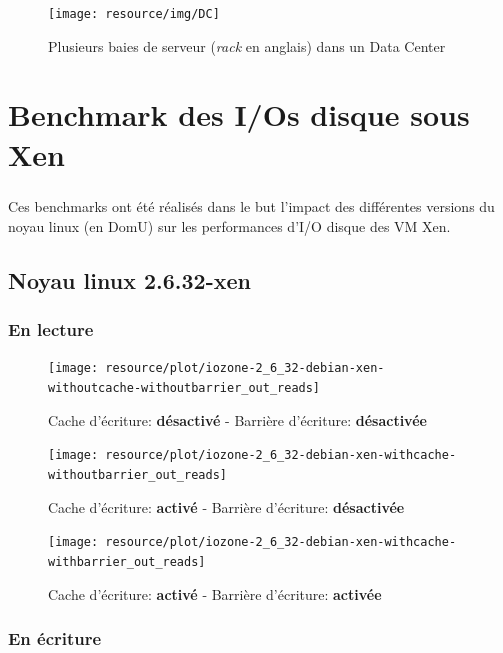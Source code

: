 \begin{figure}[H]
	\centering
	\texttt{[image: resource/img/DC]}
	\caption{Plusieurs baies de serveur (\emph{rack} en anglais) dans un Data Center}
\end{figure}


\chapter{Benchmark des I/Os disque sous Xen}

\paragraph*{}
Ces benchmarks ont été réalisés dans le but l'impact des différentes versions du noyau linux
(en DomU) sur les performances d'I/O disque des VM Xen.


\section{Noyau linux 2.6.32-xen}

\subsection*{En lecture}

\begin{figure}[H]
	\centering
	\texttt{[image: resource/plot/iozone-2\_6\_32-debian-xen-withoutcache-withoutbarrier\_out\_reads]}
	\caption{Cache d'écriture: \textbf{désactivé}   -   Barrière d'écriture: \textbf{désactivée}}
\end{figure}

\begin{figure}[H]
	\centering
	\texttt{[image: resource/plot/iozone-2\_6\_32-debian-xen-withcache-withoutbarrier\_out\_reads]}
	\caption{Cache d'écriture: \textbf{activé}   -   Barrière d'écriture: \textbf{désactivée}}
\end{figure}

\begin{figure}[H]
	\centering
	\texttt{[image: resource/plot/iozone-2\_6\_32-debian-xen-withcache-withbarrier\_out\_reads]}
	\caption{Cache d'écriture: \textbf{activé}   -   Barrière d'écriture: \textbf{activée}}
\end{figure}

\subsection*{En écriture}

